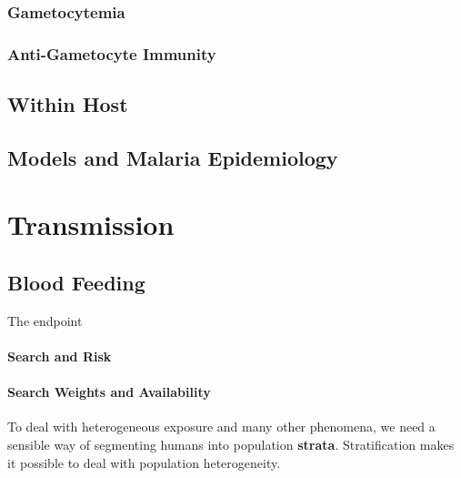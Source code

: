 \documentclass[
]{book}
\begin{document}
\section{Gametocytemia}\label{gametocytemia}

\section{Anti-Gametocyte Immunity}\label{anti-gametocyte-immunity}

\chapter{Within Host}\label{within-host}

\chapter{}\label{section-1}

\chapter{Models and Malaria Epidemiology}\label{models-and-malaria-epidemiology}

\section{}\label{section-2}

\part{Transmission}\label{part-transmission}

\chapter{Blood Feeding}\label{blood-feeding}

The endpoint

\subsection{Search and Risk}\label{search-and-risk}

\subsection{Search Weights and Availability}\label{search-weights-and-availability}

To deal with heterogeneous exposure and many other phenomena, we need a sensible way of segmenting humans into population \textbf{strata}. Stratification makes it possible to deal with population heterogeneity.
\end{document}
